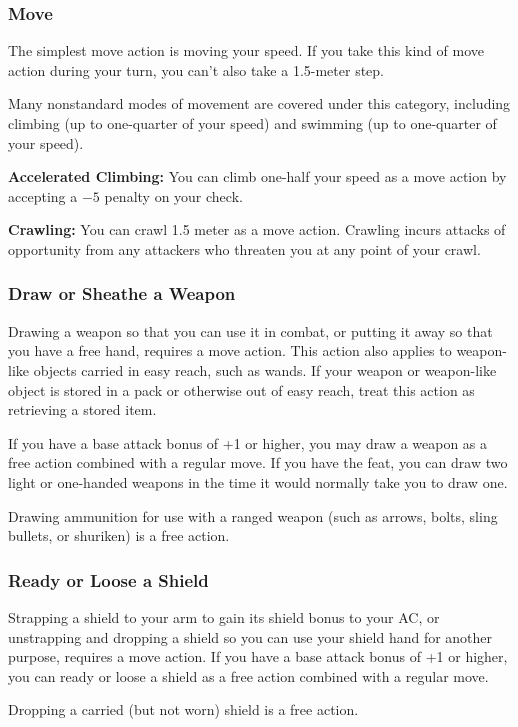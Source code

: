 \subsubsection{Move}
The simplest move action is moving your speed. If you take this kind of move action during your turn, you can't also take a 1.5-meter step.

Many nonstandard modes of movement are covered under this category, including climbing (up to one-quarter of your speed) and swimming (up to one-quarter of your speed).

\textbf{Accelerated Climbing:} You can climb one-half your speed as a move action by accepting a $-5$ penalty on your  check.

\textbf{Crawling:} You can crawl 1.5 meter as a move action. Crawling incurs attacks of opportunity from any attackers who threaten you at any point of your crawl.

\subsubsection{Draw or Sheathe a Weapon}
Drawing a weapon so that you can use it in combat, or putting it away so that you have a free hand, requires a move action. This action also applies to weapon-like objects carried in easy reach, such as wands. If your weapon or weapon-like object is stored in a pack or otherwise out of easy reach, treat this action as retrieving a stored item.

If you have a base attack bonus of +1 or higher, you may draw a weapon as a free action combined with a regular move. If you have the  feat, you can draw two light or one-handed weapons in the time it would normally take you to draw one.

Drawing ammunition for use with a ranged weapon (such as arrows, bolts, sling bullets, or shuriken) is a free action.

\subsubsection{Ready or Loose a Shield}
Strapping a shield to your arm to gain its shield bonus to your AC, or unstrapping and dropping a shield so you can use your shield hand for another purpose, requires a move action. If you have a base attack bonus of +1 or higher, you can ready or loose a shield as a free action combined with a regular move.

Dropping a carried (but not worn) shield is a free action.

